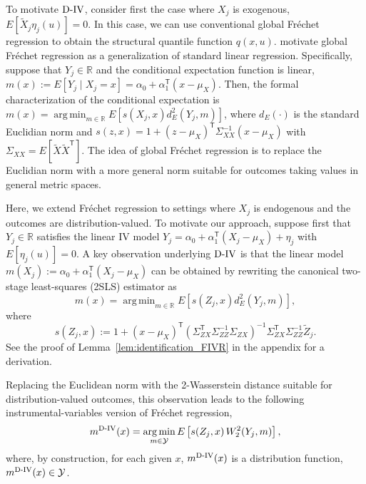 \documentclass[12pt]{article}
\newcommand{\T}{\mathsf{T}} %
\DeclareMathOperator*{\argmin}{arg\,min}
\newcommand{\est}{\ensuremath{\textnormal{D-IV}}\xspace}
\newcommand{\calP}{\mathcal{Y}} %
\begin{document}
To motivate \est, consider first the case where $X_j$ is exogenous, $E[\tilde{X}_j\eta_j(u)]=0$. In this case, we can use conventional global Fr\'echet regression \citep{petersen2019frechet} to obtain the structural quantile function $q(x,u)$. \citeauthor{petersen2019frechet} motivate global Fr\'echet regression as a generalization of standard linear regression. Specifically, suppose that $Y_j\in \mathbb{R}$ and the conditional expectation function is linear, $m(x):=E\left[Y_j\mid X_j=x\right]=\alpha_0+\alpha_1^{\!\T}(x-\mu_X)$. Then, the formal characterization of the conditional expectation is $m(x)=\argmin_{m\in \mathbb{R}}E\left[s(X_j,x)d_E^2(Y_j,m)\right]$, where $d_E(\cdot)$ is the standard Euclidian norm and $s(z,x)=1+(z-\mu_X)^{\!\T} \Sigma_{XX}^{-1}(x-\mu_X)$ with $\Sigma_{XX}=E\left[\tilde{X}\tilde{X}^{\!\T}\right]$. The idea of global Fr\'echet regression is to replace the Euclidian norm with a more general norm suitable for outcomes taking values in general metric spaces.

Here, we extend Fr\'echet regression to settings where $X_j$ is endogenous and the outcomes are distribution-valued. To motivate our approach, suppose first that $Y_j\in \mathbb{R}$ satisfies the linear IV model $Y_j=\alpha_0 + \alpha_1^{\!\T}(X_j-\mu_X) + \eta_j$ with $E[\eta_j(u)]=0$. A key observation underlying \est is that the linear model $m(X_j):=\alpha_0 + \alpha_1^{\!\T}(X_j-\mu_X)$ can be obtained by rewriting the canonical two-stage least-squares (2SLS) estimator as
$$
m(x)=\argmin_{m \in \mathbb{R}} E\left[s(Z_j,x)d_E^2(Y_j,m) \right],
$$
where
\begin{equation}\label{eq:s-weight-fivr_intercept_main}
   s(Z_j, x) := 1 + (x-\mu_X)^{\!\T} (\Sigma_{ZX}^{\!\T}\Sigma_{ZZ}^{-1}\Sigma_{ZX})^{-1} \Sigma_{ZX}^{\!\T}\Sigma_{ZZ}^{-1} \tilde Z_j.
\end{equation}
See the proof of Lemma~\ref{lem:identification_FIVR} in the appendix for a derivation.

Replacing the Euclidean norm with the 2-Wasserstein distance suitable for distribution-valued outcomes, this observation leads to the following instrumental-variables version of Fr\'echet regression,
\begin{equation}\label{eq:frechet-objective-fivr_intercept_pop}
  m^{\est}(x) = \argmin_{m\in\calP} E\left[s(Z_j,x)\,W_2^{2}(Y_j,m)\right],
\end{equation}
where, by construction, for each given $x$, $m^{\est}(x)$ is a distribution function, $m^{\est}(x)\in \calP$.
\end{document}
